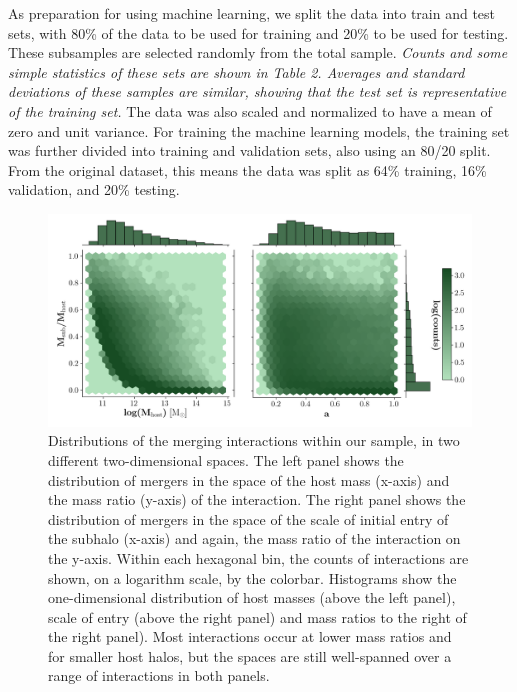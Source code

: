 \documentclass[fleqn,usenatbib]{mnras}
\begin{document}
\par
    As preparation for using machine learning, we split the data into train and test sets, with 80\% of the data to be used for training and 20\% to be used for testing. These subsamples are selected randomly from the total sample. \textit{Counts and some simple statistics of these sets are shown in Table 2. Averages and standard deviations of these samples are similar, showing that the test set is representative of the training set.} The data was also scaled and normalized to have a mean of zero and unit variance. For training the machine learning models, the training set was further divided into training and validation sets, also using an 80/20 split. From the original dataset, this means the data was split as 64\% training, 16\% validation, and 20\% testing.


\begin{figure}
	\includegraphics[width=\textwidth]{Figures/combined_distributions_logbin}
    \caption{Distributions of the merging interactions within our sample, in two different two-dimensional spaces. The left panel shows the distribution of mergers in the space of the host mass (x-axis) and the mass ratio (y-axis) of the interaction. The right panel shows the distribution of mergers in the space of the scale of initial entry of the subhalo (x-axis) and again, the mass ratio of the interaction on the y-axis. Within each hexagonal bin, the counts of interactions are shown, on a logarithm scale, by the colorbar. Histograms show the one-dimensional distribution of host masses (above the left panel), scale of entry (above the right panel) and mass ratios to the right of the right panel). Most interactions occur at lower mass ratios and for smaller host halos, but the spaces are still well-spanned over a range of interactions in both panels. }
    \label{fig:combined_distributions_logBin}
\end{figure}
\end{document}
